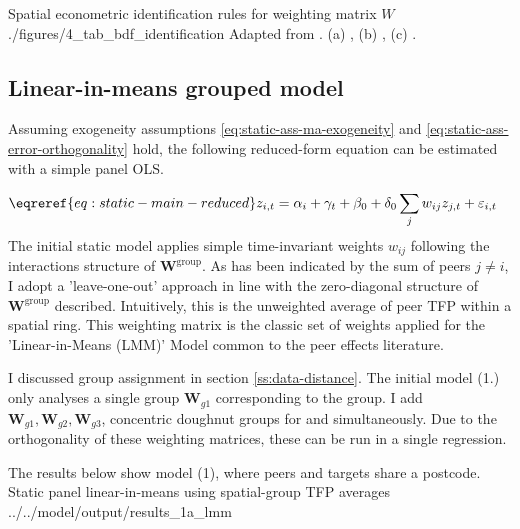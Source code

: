 \wraptable
    {Spatial econometric identification rules for weighting matrix $W$}
    {./figures/4_tab_bdf_identification}
    {
        Adapted from .
        (a) ,
        (b) ,
        (c) .
    }


\subsection{Linear-in-means grouped model}
\label{ss:model-lmm}

Assuming exogeneity assumptions \eqref{eq:static-ass-ma-exogeneity} and \eqref{eq:static-ass-error-orthogonality} hold,
the following reduced-form equation can be estimated with a simple panel OLS.

\begin{align}
    \eqreref{eq:static-main-reduced}
    z_{i,t} &= \alpha_i + \gamma_t + \beta_0 + \delta_0 \sum_{j} w_{ij}z_{j,t} + \varepsilon_{i,t}
\end{align}
%
The initial static model applies simple time-invariant weights $w_{ij}$
following the interactions structure of $\mathbf W^\text{group}$.
As has been indicated by the sum of peers $j\neq i$,
I adopt a 'leave-one-out' approach in line with
the zero-diagonal structure of $\mathbf W^\text{group}$ described.
Intuitively, this is the unweighted average of peer TFP within a spatial ring.
This weighting matrix is the classic set of weights applied for the 'Linear-in-Means (LMM)' Model
common to the peer effects literature.
\par
I discussed group assignment in section \ref{ss:data-distance}.
The initial model (1.) only analyses a single group $\mathbf W_{g1}$ corresponding to the  group.
I add $\mathbf W_{g1}, \mathbf W_{g2}, \mathbf W_{g3}$, concentric doughnut groups
for  and  simultaneously.
Due to the orthogonality of these weighting matrices, these can be run in a single regression.
\par
The results below show model (1), where peers and targets share a postcode.
\wraptable
    { Static panel linear-in-means using spatial-group TFP averages}
    {../../model/output/results_1a_lmm}
    {}


